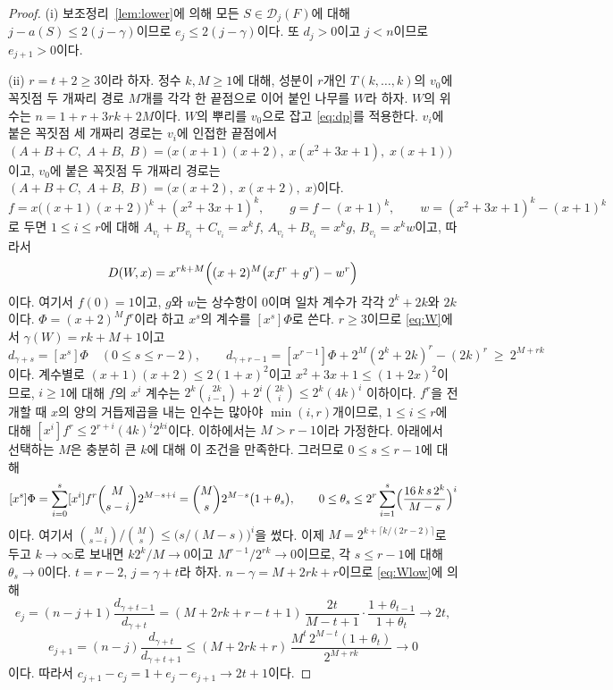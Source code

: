 \documentclass[11pt,a4paper]{article}
\theoremstyle{definition}
\newcommand{\Dom}{\mathcal{D}}
\begin{document}
\begin{proof}
(i) 보조정리~\ref{lem:lower}에 의해 모든 $S\in\Dom_j(F)$에 대해
$j-a(S)\le2(j-\gamma)$이므로 $e_j\le2(j-\gamma)$이다. 또 $d_j>0$이고 $j<n$이므로
$e_{j+1}>0$이다.

(ii) $r=t+2\ge3$이라 하자. 정수 $k,M\ge1$에 대해, 성분이 $r$개인 $T(k,\dots,k)$의
$v_0$에 꼭짓점 두 개짜리 경로 $M$개를 각각 한 끝점으로 이어 붙인 나무를 $W$라 하자.
$W$의 위수는 $n=1+r+3rk+2M$이다. $W$의 뿌리를 $v_0$으로 잡고 \eqref{eq:dp}를 적용한다.
$v_i$에 붙은 꼭짓점 세 개짜리 경로는 $v_i$에 인접한 끝점에서
$(A+B+C,\;A+B,\;B)=\bigl(x(x+1)(x+2),\;x(x^2+3x+1),\;x(x+1)\bigr)$이고, $v_0$에 붙은
꼭짓점 두 개짜리 경로는 $(A+B+C,\;A+B,\;B)=\bigl(x(x+2),\;x(x+2),\;x\bigr)$이다.
\[
  f=x\bigl((x+1)(x+2)\bigr)^k+(x^2+3x+1)^k,\qquad g=f-(x+1)^k,\qquad
  w=(x^2+3x+1)^k-(x+1)^k
\]
로 두면 $1\le i\le r$에 대해 $A_{v_i}+B_{v_i}+C_{v_i}=x^kf$, $A_{v_i}+B_{v_i}=x^kg$,
$B_{v_i}=x^kw$이고, 따라서
\begin{equation}\label{eq:W}
  D(W,x)=x^{rk+M}\Bigl((x+2)^M\bigl(xf^r+g^r\bigr)-w^r\Bigr)
\end{equation}
이다. 여기서 $f(0)=1$이고, $g$와 $w$는 상수항이 $0$이며 일차 계수가 각각 $2^k+2k$와
$2k$이다. $\Phi=(x+2)^Mf^r$이라 하고 $x^s$의 계수를 $[x^s]\Phi$로 쓴다. $r\ge3$이므로
\eqref{eq:W}에서 $\gamma(W)=rk+M+1$이고
\begin{equation}\label{eq:Wlow}
  d_{\gamma+s}=[x^s]\Phi\quad(0\le s\le r-2),\qquad
  d_{\gamma+r-1}=[x^{r-1}]\Phi+2^M(2^k+2k)^r-(2k)^r\ \ge\ 2^{M+rk}
\end{equation}
이다. 계수별로 $(x+1)(x+2)\le2(1+x)^2$이고 $x^2+3x+1\le(1+2x)^2$이므로, $i\ge1$에 대해
$f$의 $x^i$ 계수는 $2^k\binom{2k}{i-1}+2^i\binom{2k}{i}\le2^k(4k)^i$ 이하이다. $f^r$을
전개할 때 $x$의 양의 거듭제곱을 내는 인수는 많아야 $\min(i,r)$개이므로, $1\le i\le r$에
대해 $[x^i]f^r\le2^{r+i}(4k)^i2^{ki}$이다. 이하에서는 $M>r-1$이라 가정한다. 아래에서 선택하는 $M$은 충분히 큰 $k$에 대해 이 조건을 만족한다. 그러므로 $0\le s\le r-1$에 대해
\[
  [x^s]\Phi=\sum_{i=0}^{s}[x^i]f^r\binom{M}{s-i}2^{M-s+i}
  =\binom Ms2^{M-s}\bigl(1+\theta_s\bigr),\qquad
  0\le\theta_s\le2^r\sum_{i=1}^{s}\Bigl(\frac{16\,k\,s\,2^k}{M-s}\Bigr)^{i}
\]
이다. 여기서 $\binom{M}{s-i}\big/\binom Ms\le\bigl(s/(M-s)\bigr)^i$을 썼다. 이제
$M=2^{k+\lceil k/(2r-2)\rceil}$로 두고 $k\to\infty$로 보내면 $k2^k/M\to0$이고
$M^{r-1}/2^{rk}\to0$이므로, 각 $s\le r-1$에 대해 $\theta_s\to0$이다. $t=r-2$,
$j=\gamma+t$라 하자. $n-\gamma=M+2rk+r$이므로 \eqref{eq:Wlow}에 의해
\[
  e_j=(n-j+1)\frac{d_{\gamma+t-1}}{d_{\gamma+t}}
     =(M+2rk+r-t+1)\,\frac{2t}{M-t+1}\cdot\frac{1+\theta_{t-1}}{1+\theta_t}
     \longrightarrow2t ,
\]
\[
  e_{j+1}=(n-j)\frac{d_{\gamma+t}}{d_{\gamma+t+1}}
     \le(M+2rk+r)\,\frac{M^{t}\,2^{M-t}(1+\theta_t)}{2^{M+rk}}
     \longrightarrow0
\]
이다. 따라서 $c_{j+1}-c_j=1+e_j-e_{j+1}\to2t+1$이다.
\end{proof}
\end{document}
